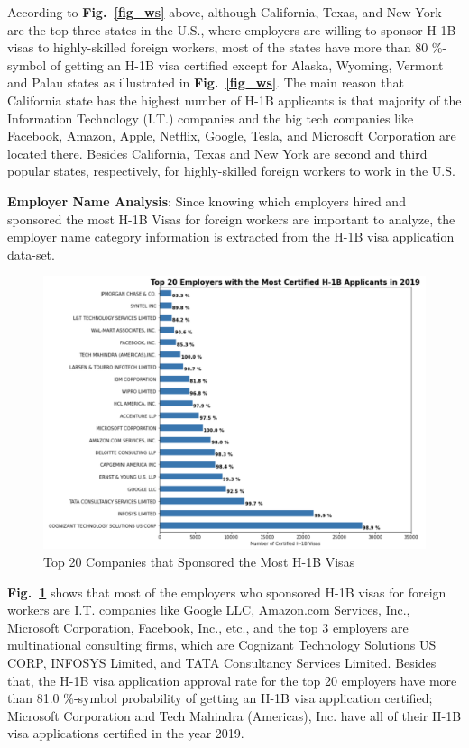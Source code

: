 \documentclass[conference]{IEEEtran}
\begin{document}
According to \textbf{Fig.~\ref{fig_ws}} above, although California, Texas, and New York are the top three states in the U.S., where employers are willing to sponsor H-1B visas to highly-skilled foreign workers, most of the states have more than 80 \%-symbol of getting an H-1B visa certified except for Alaska, Wyoming, Vermont and Palau states as illustrated in \textbf{Fig.~\ref{fig_ws}}. The main reason that California state has the highest number of H-1B applicants is that majority of the Information Technology (I.T.) companies and the big tech companies like Facebook, Amazon, Apple, Netflix, Google, Tesla, and Microsoft Corporation are located there. Besides California, Texas and New York are second and third popular states, respectively, for highly-skilled foreign workers to work in the U.S.

\textbf{Employer Name Analysis}: Since knowing which employers hired and sponsored the most H-1B Visas for foreign workers are important to analyze, the employer name category information is extracted from the H-1B visa application data-set.

\begin{figure}[htbp]
\centerline{\includegraphics[scale = 0.28]{Employer_Name_20.png}}
\caption{Top 20 Companies that Sponsored the Most H-1B Visas}
\label{fig_en_1}
\end{figure}

\textbf{Fig.~\ref{fig_en_1}} shows that most of the employers who sponsored H-1B visas for foreign workers are I.T. companies like Google LLC, Amazon.com Services, Inc., Microsoft Corporation, Facebook, Inc., etc., and the top 3 employers are multinational consulting firms, which are Cognizant Technology Solutions US CORP, INFOSYS Limited, and TATA Consultancy Services Limited. Besides that, the H-1B visa application approval rate for the top 20 employers have more than 81.0 \%-symbol probability of getting an H-1B visa application certified; Microsoft Corporation and Tech Mahindra (Americas), Inc. have all of their H-1B visa applications certified in the year 2019.
\end{document}
